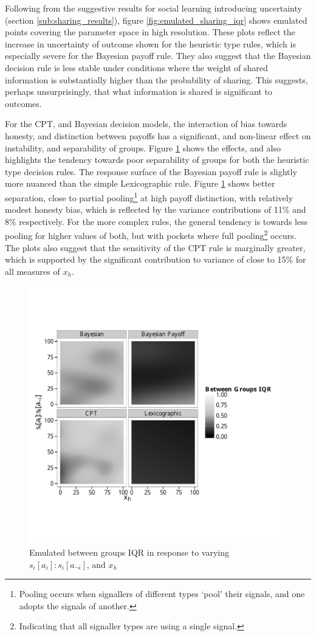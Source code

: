 Following from the suggestive results for social learning introducing uncertainty (section \ref{sub:sharing_results}), figure \ref{fig:emulated_sharing_iqr} shows emulated points covering the parameter space in high resolution. These plots reflect the increase in uncertainty of outcome shown for the heuristic type rules, which is especially severe for the Bayesian payoff rule. They also suggest that the Bayesian decision rule is less stable under conditions where the weight of shared information is substantially higher than the probability of sharing. This suggests, perhaps unsurprisingly, that what information is shared is significant to outcomes.

For the \ac{CPT}, and Bayesian decision models, the interaction of bias towards honesty, and distinction between payoffs has a significant, and non-linear effect on instability, and separability of groups. Figure \ref{fig:emulated_payoff_group_iqr} shows the effects, and also highlights the tendency towards poor separability of groups for both the heuristic type decision rules. The response surface of the Bayesian payoff rule is slightly more nuanced than the simple Lexicographic rule. Figure \ref{fig:emulated_payoff_group_iqr} shows better separation, close to partial pooling\footnote{Pooling occurs when signallers of different types `pool' their signals, and one adopts the signals of another.} at high payoff distinction, with relatively modest honesty bias, which is reflected by the variance contributions of 11\% and 8\% respectively.  For the more complex rules, the general tendency is towards less pooling for higher values of both, but with pockets where full pooling\footnote{Indicating that all signaller types are using a single signal.} occurs.  The plots also suggest that the sensitivity of the \ac{CPT} rule is marginally greater, which is supported by the significant contribution to variance of close to 15\% for all measures of \(x_{h}\).

\begin{figure}[H]
\includegraphics[width=119mm]{figures/unfixed_emu_payoff_honesty_group_iqr}
\caption{Emulated between groups IQR in response to varying \(s_{i}[a_{i}]:s_{i}[a_{\neg i}]\), and \(x_{h}\)}
\label{fig:emulated_payoff_group_iqr}
\end{figure}
